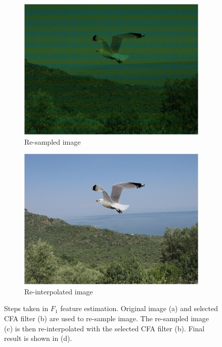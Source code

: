 \documentclass{template/acm_proc_article-sp}
\begin{document}
\begin{figure}[H]
\begin{subfigure}{0.23\textwidth}
    \includegraphics[trim=0 0 0 0,clip,width=\linewidth]{report/results/f1_steps_2.jpg}
    \caption{Re-sampled image}
\end{subfigure}
\hspace*{\fill}
\begin{subfigure}{0.23\textwidth}
    \includegraphics[trim=0 0 0 0,clip,width=\linewidth]{report/results/f1_steps_3.jpg}
    \caption{Re-interpolated image}
\end{subfigure}

\caption{Steps taken in $F_1$ feature estimation. Original image (a) and selected CFA filter (b) are used to re-sample image. The re-sampled image (c) is then re-interpolated with the selected CFA filter (b). Final result is shown in (d).}
\label{img_f1_steps}
\end{figure}
\vfill\null
\end{document}
